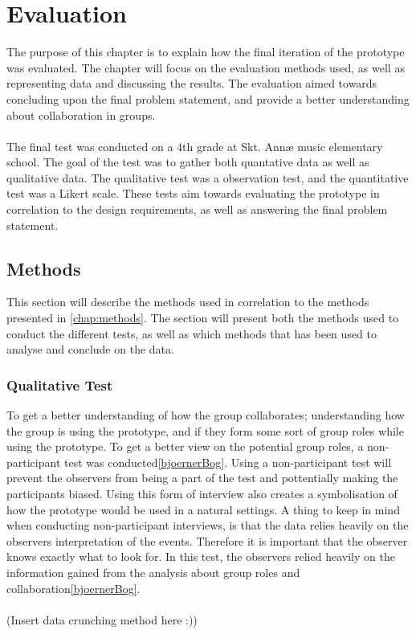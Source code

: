 \chapter{Evaluation}

The purpose of this chapter is to explain how the final iteration of the prototype was evaluated. The chapter will focus on the evaluation methods used, as well as representing data and discussing the results. The evaluation aimed towards concluding upon the final problem statement, and provide a better understanding about collaboration in groups.\\\\
The final test was conducted on a 4th grade at Skt. Annæ music elementary school. The goal of the test was to gather both quantative data as well as qualitative data. The qualitative test was a observation test, and the quantitative test was a Likert scale. These tests aim towards evaluating the prototype in correlation to the design requirements, as well as answering the final problem statement.

\section{Methods}
This section will describe the methods used in correlation to the methods presented in \autoref{chap:methods}. The section will present both the methods used to conduct the different tests, as well as which methods that has been used to analyse and conclude on the data. 

\subsection{Qualitative Test}
To get a better understanding of how the group collaborates; understanding how the group is using the prototype, and if they form some sort of group roles while using the prototype. To get a better view on the potential group roles, a non-participant test was conducted\ref{bjoernerBog}. Using a non-participant test will prevent the observers from being a part of the test and pottentially making the participants biased. Using this form of interview also creates a symbolisation of how the prototype would be used in a natural settings. A thing to keep in mind when conducting non-participant interviews, is that the data relies heavily on the observers interpretation of the events. Therefore it is important that the observer knows exactly what to look for. In this test, the observers relied heavily on the information gained from the analysis about group roles and collaboration\ref{bjoernerBog}.\\\\
(Insert data crunching method here :))

